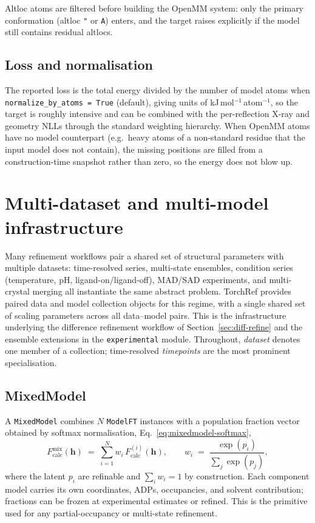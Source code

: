 \documentclass{iucrjournals}
\begin{document}
Altloc atoms are filtered before building the OpenMM system: only the
primary conformation (altloc \texttt{"} or \texttt{A}) enters, and the
target raises explicitly if the model still contains residual altlocs.

\subsection{Loss and normalisation}

The reported loss is the total energy divided by the number of model
atoms when \texttt{normalize\_by\_atoms = True} (default), giving units of
kJ\,mol$^{-1}$\,atom$^{-1}$, so the target is roughly intensive and can
be combined with the per-reflection X-ray and geometry NLLs through the
standard weighting hierarchy.  When OpenMM atoms have no model
counterpart (e.g.\ heavy atoms of a non-standard residue that the input
model does not contain), the missing positions are filled from a
construction-time snapshot rather than zero, so the energy does not
blow up.


\section{Multi-dataset and multi-model infrastructure}\label{sec:collection}

Many refinement workflows pair a shared set of structural parameters with
multiple datasets: time-resolved series, multi-state ensembles, condition
series (temperature, pH, ligand-on/ligand-off), MAD/SAD experiments, and
multi-crystal merging all instantiate the same abstract problem.  TorchRef
provides paired data and model collection objects for this regime, with a
single shared set of scaling parameters across all data--model pairs.
This is the infrastructure underlying the difference refinement workflow of
Section~\ref{sec:diff-refine} and the ensemble extensions in the
\texttt{experimental} module.  Throughout, \emph{dataset} denotes one member
of a collection; time-resolved \emph{timepoints} are the most prominent
specialisation.

\subsection{MixedModel}

A \texttt{MixedModel} combines $N$ \texttt{ModelFT} instances with a
population fraction vector obtained by softmax normalisation,
Eq.~\ref{eq:mixedmodel-softmax},
%
\begin{equation}
  F_\mathrm{calc}^\mathrm{mix}(\mathbf{h})
  \;=\; \sum_{i=1}^{N} w_{i}\, F_\mathrm{calc}^{(i)}(\mathbf{h}),
  \qquad
  w_{i} \;=\;
  \frac{\exp(p_{i})}{\sum_{j} \exp(p_{j})},
  \label{eq:mixedmodel-softmax}
\end{equation}
%
where the latent $p_{i}$ are refinable and $\sum_{i} w_{i} = 1$ by
construction.
Each component model carries its own coordinates, ADPs, occupancies, and
solvent contribution; fractions can be frozen at experimental estimates
or refined.  This is the primitive used for any partial-occupancy or
multi-state refinement.
\end{document}
